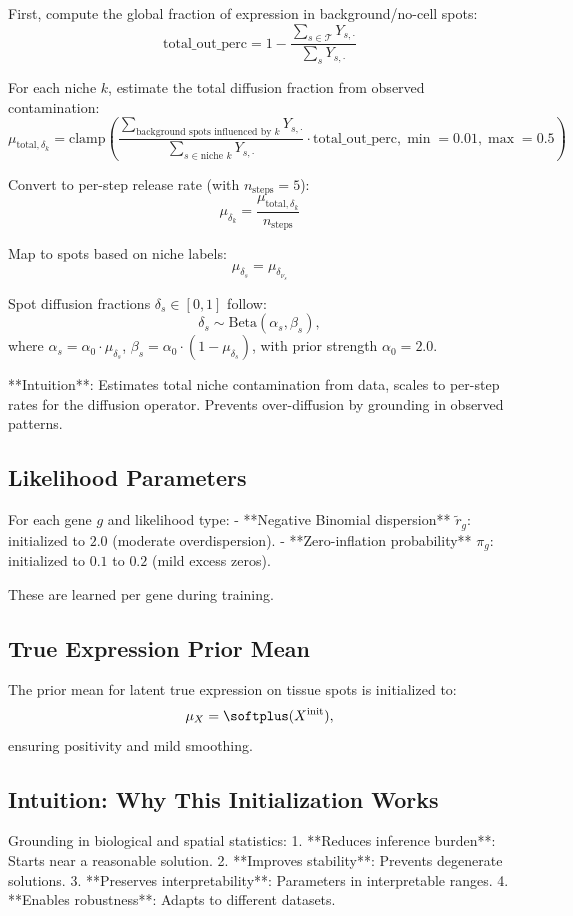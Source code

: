 \documentclass[11pt]{article}
\begin{document}
First, compute the global fraction of expression in background/no-cell spots:
\[
\text{total\_out\_perc} = 1 - \frac{\sum_{s \in \mathcal{T}} Y_{s,\cdot}}{\sum_{s} Y_{s,\cdot}}
\]

For each niche $k$, estimate the total diffusion fraction from observed contamination:
\[
\mu_{\text{total},\delta_k} = \text{clamp}\left( \frac{\sum_{\text{background spots influenced by } k} Y_{s,\cdot}}{\sum_{s \in \text{niche } k} Y_{s,\cdot}} \cdot \text{total\_out\_perc}, \min=0.01, \max=0.5 \right)
\]

Convert to per-step release rate (with $n_{\text{steps}}=5$):
\[
\mu_{\delta_k} = \frac{\mu_{\text{total},\delta_k}}{n_{\text{steps}}}
\]

Map to spots based on niche labels:
\[
\mu_{\delta_s} = \mu_{\delta_{\nu_s}}
\]

Spot diffusion fractions $\delta_s \in [0,1]$ follow:
\[
\delta_s \sim \text{Beta}(\alpha_s, \beta_s),
\]
where $\alpha_s = \alpha_0 \cdot \mu_{\delta_s}$, $\beta_s = \alpha_0 \cdot (1 - \mu_{\delta_s})$, with prior strength $\alpha_0 = 2.0$.

**Intuition**: Estimates total niche contamination from data, scales to per-step rates for the diffusion operator. Prevents over-diffusion by grounding in observed patterns.

\subsection{Likelihood Parameters}

For each gene $g$ and likelihood type:
- **Negative Binomial dispersion** $\tilde{r}_g$: initialized to $2.0$ (moderate overdispersion).
- **Zero-inflation probability** $\pi_g$: initialized to $0.1$ to $0.2$ (mild excess zeros).

These are learned per gene during training.

\subsection{True Expression Prior Mean}

The prior mean for latent true expression on tissue spots is initialized to:
\[
\mu_X = \softplus(X^{\text{init}}),
\]
ensuring positivity and mild smoothing.

\subsection{Intuition: Why This Initialization Works}

Grounding in biological and spatial statistics:
1. **Reduces inference burden**: Starts near a reasonable solution.
2. **Improves stability**: Prevents degenerate solutions.
3. **Preserves interpretability**: Parameters in interpretable ranges.
4. **Enables robustness**: Adapts to different datasets.
\end{document}
